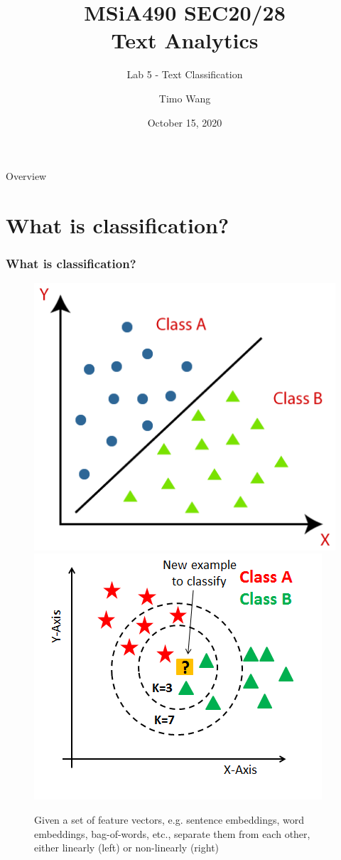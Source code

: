 \documentclass{beamer}
\begin{document}
\title{MSiA490 SEC20/28\\ Text Analytics}
\subtitle{Lab 5 - Text Classification}
\author{Timo Wang}
\date{October 15, 2020}

\begin{frame}
    \titlepage
\end{frame}

\begin{frame}{Overview}
    \tableofcontents[hideallsubsections]
\end{frame}

\section{What is classification?}
\begin{frame}
    \frametitle{What is classification?}
    \begin{figure}
        \includegraphics[scale=0.23]{classification}
        \includegraphics[scale=0.25]{knn_classification}
        \caption{Given a set of feature vectors, e.g. sentence embeddings, word embeddings, bag-of-words, etc., separate them from each other, either linearly (left) or non-linearly (right)}
    \end{figure}
\end{frame}
\end{document}
